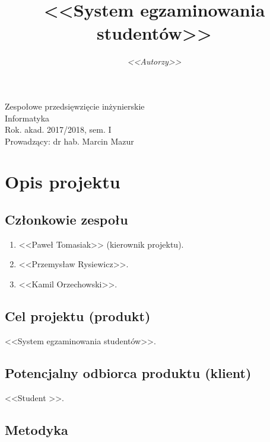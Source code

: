 \documentclass[a4paper]{article}
\title{\bf{<<System egzaminowania studentów>>}}
\author{{\em <<Autorzy>>}}
\date{}
\begin{document}
\begin{titlepage}
\maketitle
\thispagestyle{empty}
\bigskip
\begin{center}
Zespołowe przedsięwzięcie inżynierskie\\[2mm]

Informatyka\\[2mm]

Rok. akad. 2017/2018, sem. I\\[2mm]

Prowadzący: dr hab. Marcin Mazur
\end{center}
\end{titlepage}

\tableofcontents
\thispagestyle{empty}

\newpage

\section{Opis projektu}

\subsection{Członkowie zespołu}

\begin{enumerate}
\item <<Paweł Tomasiak>> (kierownik projektu).
\item <<Przemysław Rysiewicz>>.
\item <<Kamil Orzechowski>>.
\end{enumerate}

\subsection{Cel projektu (produkt)}

<<System egzaminowania studentów>>.

\subsection{Potencjalny odbiorca produktu (klient)}

<<Student >>.

\subsection{Metodyka}
\end{document}
